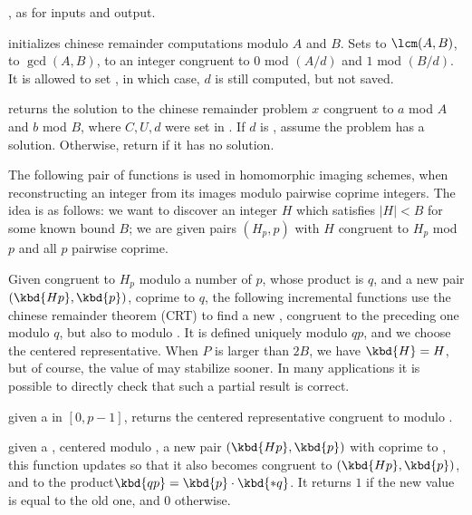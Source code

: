 , as
 for  inputs and output.

initializes chinese remainder computations modulo $A$ and $B$. Sets
 to $\lcm(A,B)$,  to $\gcd(A,B)$,
 to an integer congruent to $0$ mod $(A/d)$ and $1$ mod $(B/d)$.
It is allowed to set , in which case, $d$ is still
computed, but not saved.

 returns
the solution to the chinese remainder problem $x$ congruent
to $a$ mod $A$ and $b$ mod $B$, where $C, U, d$ were set in
. If $d$ is , assume the problem has a
solution. Otherwise, return  if it has no solution.

\medskip

The following pair of functions is used in homomorphic imaging schemes,
when reconstructing an integer from its images modulo pairwise coprime
integers. The idea is as follows: we want to discover an integer $H$ which
satisfies $|H| < B$ for some known bound $B$; we are given pairs $(H_p, p)$
with $H$ congruent to $H_p$ mod $p$ and all $p$ pairwise coprime.

Given  congruent to $H_p$ modulo a number of $p$, whose product is
$q$, and a new pair $(\kbd{Hp}, \kbd{p})$,  coprime to $q$, the
following incremental functions use the chinese remainder theorem (CRT) to
find a new , congruent to the preceding one modulo $q$, but also to
 modulo . It is defined uniquely modulo $qp$, and we choose
the centered representative. When $P$ is larger than $2B$, we have $\kbd{H} =
H$, but of course, the value of  may stabilize sooner. In many
applications it is possible to directly check that such a partial result is
correct.

 given a   in
$[0, p-1]$, returns the centered representative  congruent to 
modulo .

given a  , centered modulo , a new pair $(\kbd{Hp},
\kbd{p})$ with  coprime to , this function updates  so
that it also becomes congruent to $(\kbd{Hp}, \kbd{p})$, and  to the
product$\kbd{qp} = \kbd{p} \cdot \kbd{*q}$. It returns $1$ if the new value
is equal to the old one, and $0$ otherwise.

